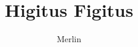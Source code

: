 \documentclass{report}
\begin{document}
\title{Higitus Figitus}
\author{Merlin}
\date{}
\maketitle

\tableofcontents






\printindex
\end{document}
